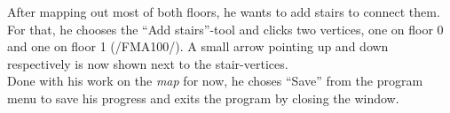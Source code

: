 After mapping out most of both floors, he wants to add stairs to connect them. For that, he chooses the ``Add stairs''-tool and clicks two vertices, one on floor 0 and one on floor 1 (/FMA100/). A small arrow pointing up and down respectively is now shown next to the stair-vertices.\\
Done with his work on the \textit{map} for now, he choses ``Save'' from the program menu to save his progress and exits the program by closing the window.





%
%
%
%
%
